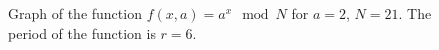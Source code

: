 \begin{figure}
\centering



\caption{Graph of the function $f\left(x, a\right) = a^x \mod{N}$ for $a=2$, $N = 21$. The period of the function is $r=6$.}
\label{picPart4QuantCompShorClassPart}
\end{figure}